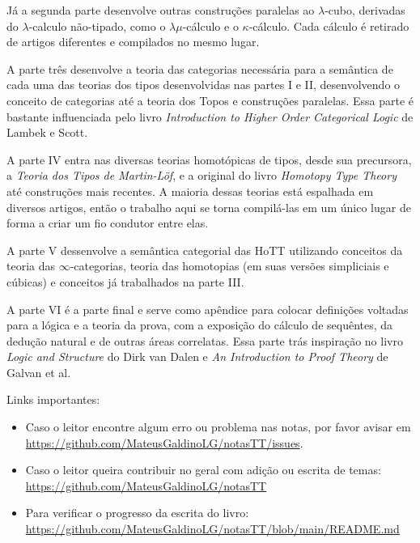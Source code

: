 \documentclass[../main.tex]{subfiles}
\begin{document}
Já a segunda parte desenvolve outras construções paralelas ao $\lambda$-cubo, derivadas do $\lambda$-calculo não-tipado, como o $\lambda\mu$-cálculo e o $\kappa$-cálculo. Cada cálculo é retirado de artigos diferentes e compilados no mesmo lugar.

A parte três desenvolve a teoria das categorias necessária para a semântica de cada uma das teorias dos tipos desenvolvidas nas partes I e II, desenvolvendo o conceito de categorias até a teoria dos Topos e construções paralelas. Essa parte é bastante influenciada pelo livro \emph{Introduction to Higher Order Categorical Logic} de Lambek e Scott.

A parte IV entra nas diversas teorias homotópicas de tipos, desde sua precursora, a \emph{Teoria dos Tipos de Martin-Löf}, e a original do livro \emph{Homotopy Type Theory} até construções mais recentes. A maioria dessas teorias está espalhada em diversos artigos, então o trabalho aqui se torna compilá-las em um único lugar de forma a criar um fio condutor entre elas.

A parte V dessenvolve a semântica categorial das HoTT utilizando conceitos da teoria das $\infty$-categorias, teoria das homotopias (em suas versões simpliciais e cúbicas) e conceitos já trabalhados na parte III. 

A parte VI é a parte final e serve como apêndice para colocar definições voltadas para a lógica e a teoria da prova, com a exposição do cálculo de sequêntes, da dedução natural e de outras áreas correlatas. Essa parte trás inspiração no livro \emph{Logic and Structure} do Dirk van Dalen e \emph{An Introduction to Proof Theory} de Galvan et al.

Links importantes:

\begin{itemize}
    \item Caso o leitor encontre algum erro ou problema nas notas, por favor avisar em \url{https://github.com/MateusGaldinoLG/notasTT/issues}.
    \item Caso o leitor queira contribuir no geral com adição ou escrita de temas: \url{https://github.com/MateusGaldinoLG/notasTT}
    \item Para verificar o progresso da escrita do livro: \url{https://github.com/MateusGaldinoLG/notasTT/blob/main/README.md}
\end{itemize}
\end{document}
